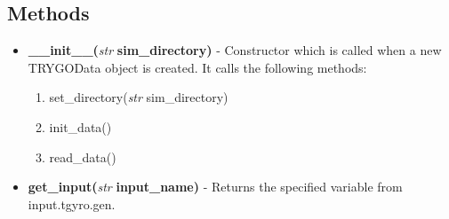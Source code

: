 \documentclass{article}
\begin{document}
\subsection{Methods}
\begin{itemize}
\item \textbf{\_\_init\_\_(}\emph{str} \textbf{ sim\_directory)} - Constructor which is called when a new TRYGOData object is created.  It calls the following methods:
\begin{enumerate}
\item set\_directory(\emph{str} sim\_directory)
\item init\_data()
\item read\_data()
\end{enumerate}
\item \textbf{get\_input(}\emph{str}\textbf{ input\_name)} - Returns the specified variable from input.tgyro.gen.


\end{itemize}
\end{document}

